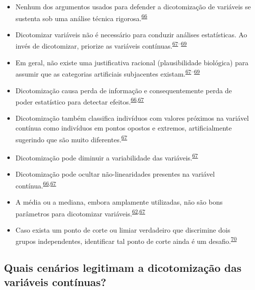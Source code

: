 \documentclass[
  a4paper,
]{book}
\begin{document}
\begin{itemize}
\item
  Nenhum dos argumentos usados para defender a dicotomização de variáveis se sustenta sob uma análise técnica rigorosa.\textsuperscript{\protect\hyperlink{ref-MacCallum2002}{66}}
\item
  Dicotomizar variáveis não é necessário para conduzir análises estatísticas. Ao invés de dicotomizar, priorize as variáveis contínuas.\textsuperscript{\protect\hyperlink{ref-Altman2006}{67}--\protect\hyperlink{ref-Collins2016}{69}}
\item
  Em geral, não existe uma justificativa racional (plausibilidade biológica) para assumir que as categorias artificiais subjacentes existam.\textsuperscript{\protect\hyperlink{ref-Altman2006}{67}--\protect\hyperlink{ref-Collins2016}{69}}
\item
  Dicotomização causa perda de informação e consequentemente perda de poder estatístico para detectar efeitos.\textsuperscript{\protect\hyperlink{ref-MacCallum2002}{66},\protect\hyperlink{ref-Altman2006}{67}}
\item
  Dicotomização também classifica indivíduos com valores próximos na variável contínua como indivíduos em pontos opostos e extremos, artificialmente sugerindo que são muito diferentes.\textsuperscript{\protect\hyperlink{ref-Altman2006}{67}}
\item
  Dicotomização pode diminuir a variabilidade das variáveis.\textsuperscript{\protect\hyperlink{ref-Altman2006}{67}}
\item
  Dicotomização pode ocultar não-linearidades presentes na variável contínua.\textsuperscript{\protect\hyperlink{ref-MacCallum2002}{66},\protect\hyperlink{ref-Altman2006}{67}}
\item
  A média ou a mediana, embora amplamente utilizadas, não são bons parâmetros para dicotomizar variáveis.\textsuperscript{\protect\hyperlink{ref-Fedorov2009}{62},\protect\hyperlink{ref-Altman2006}{67}}
\item
  Caso exista um ponto de corte ou limiar verdadeiro que discrimine dois grupos independentes, identificar tal ponto de corte ainda é um desafio.\textsuperscript{\protect\hyperlink{ref-Prince2017}{70}}
\end{itemize}

\hypertarget{quais-cenuxe1rios-legitimam-a-dicotomizauxe7uxe3o-das-variuxe1veis-contuxednuas}{%
\subsection{Quais cenários legitimam a dicotomização das variáveis contínuas?}\label{quais-cenuxe1rios-legitimam-a-dicotomizauxe7uxe3o-das-variuxe1veis-contuxednuas}}
\end{document}
